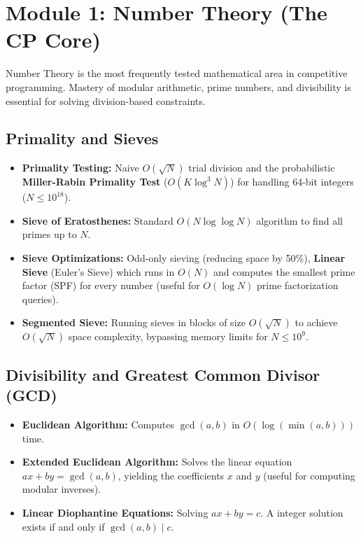 \documentclass[10pt,journal,compsoc,onecolumn]{IEEEtran}
\begin{document}
\section{Module 1: Number Theory (The CP Core)}
\label{sec:number_theory}

Number Theory is the most frequently tested mathematical area in competitive programming. Mastery of modular arithmetic, prime numbers, and divisibility is essential for solving division-based constraints.

\subsection{Primality and Sieves}
\begin{itemize}
    \item \textbf{Primality Testing:} Naive $O(\sqrt{N})$ trial division and the probabilistic \textbf{Miller-Rabin Primality Test} ($O(K \log^3 N)$) for handling 64-bit integers ($N \leq 10^{18}$).
    \item \textbf{Sieve of Eratosthenes:} Standard $O(N \log \log N)$ algorithm to find all primes up to $N$.
    \item \textbf{Sieve Optimizations:} Odd-only sieving (reducing space by 50\%), \textbf{Linear Sieve} (Euler's Sieve) which runs in $O(N)$ and computes the smallest prime factor (SPF) for every number (useful for $O(\log N)$ prime factorization queries).
    \item \textbf{Segmented Sieve:} Running sieves in blocks of size $O(\sqrt{N})$ to achieve $O(\sqrt{N})$ space complexity, bypassing memory limits for $N \leq 10^9$.
\end{itemize}

\subsection{Divisibility and Greatest Common Divisor (GCD)}
\begin{itemize}
    \item \textbf{Euclidean Algorithm:} Computes $\gcd(a, b)$ in $O(\log(\min(a, b)))$ time.
    \item \textbf{Extended Euclidean Algorithm:} Solves the linear equation $ax + by = \gcd(a, b)$, yielding the coefficients $x$ and $y$ (useful for computing modular inverses).
    \item \textbf{Linear Diophantine Equations:} Solving $ax + by = c$. A integer solution exists if and only if $\gcd(a, b) \mid c$.
\end{itemize}
\end{document}
